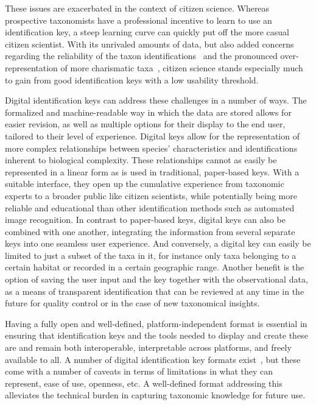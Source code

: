 \documentclass[10pt,letterpaper]{article}
\begin{document}
These issues are exacerbated in the context of citizen science. Whereas prospective taxonomists have a professional incentive to learn to use an identification key, a steep learning curve can quickly put off the more casual citizen scientist. With its unrivaled amounts of data, but also added concerns regarding the reliability of the taxon identifications~\cite{Crall2011,Burgess2017} and the pronounced over-representation of more charismatic taxa~\cite{Callaghan2020,Bayraktarov2019,Boakes2016}, citizen science stands especially much to gain from good identification keys with a low usability threshold.

Digital identification keys can address these challenges in a number of ways. The formalized and machine-readable way in which the data are stored allows for easier revision, as well as multiple options for their display to the end user, tailored to their level of experience. Digital keys allow for the representation of more complex relationships between species' characteristics and identifications inherent to biological complexity. These relationships cannot as easily be represented in a linear form as is used in traditional, paper-based keys. With a suitable interface, they open up the cumulative experience from taxonomic experts to a broader public like citizen scientists, while potentially being more reliable and educational than other identification methods such as automated image recognition. In contrast to paper-based keys, digital keys can also be combined with one another, integrating the information from several separate keys into one seamless user experience. And conversely, a digital key can easily be limited to just a subset of the taxa in it, for instance only taxa belonging to a certain habitat or recorded in a certain geographic range. Another benefit is the option of saving the user input and the key together with the observational data, as a means of transparent identification that can be reviewed at any time in the future for quality control or in the case of new taxonomical insights.

Having a fully open and well-defined, platform-independent format is essential in ensuring that identification keys and the tools needed to display and create these are and remain both interoperable, interpretable across platforms, and freely available to all. A number of digital identification key formats exist~\cite{Dallwitz1980, Lucid}, but these come with a number of caveats in terms of limitations in what they can represent, ease of use, openness, etc. A well-defined format addressing this alleviates the technical burden in capturing taxonomic knowledge for future use.
\end{document}
